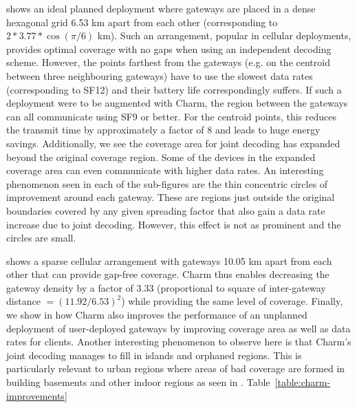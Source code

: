  shows an ideal planned deployment where gateways are placed in a dense hexagonal grid 6.53 km apart from each other (corresponding to $2*3.77*\cos(\pi/6)$ km). Such an arrangement, popular in cellular deployments, provides optimal coverage with no gaps when using an independent decoding scheme. However, the points farthest from the gateways (e.g. on the centroid between three neighbouring gateways) have to use the slowest data rates (corresponding to SF12) and their battery life correspondingly suffers. If such a deployment were to be augmented with Charm, the region between the gateways can all communicate using SF9 or better. For the centroid points, this reduces the transmit time by approximately a factor of 8 and leads to huge energy savings. Additionally, we see the coverage area for joint decoding has expanded beyond the original coverage region. Some of the devices in the expanded coverage area can even communicate with higher data rates. An interesting phenomenon seen in each of the sub-figures are the thin concentric circles of improvement around each gateway. These are regions just outside the original boundaries covered by any given spreading factor that also gain a data rate increase due to joint decoding. However, this effect is not as prominent and the circles are small.

 shows a sparse cellular arrangement with gateways 10.05 km apart from each other that can provide gap-free coverage. Charm thus enables decreasing the gateway density by a factor of 3.33 (proportional to square of inter-gateway distance $=(11.92/6.53)^2$) while providing the same level of coverage. Finally, we show in  how Charm also improves the performance of an unplanned deployment of user-deployed gateways by improving coverage area as well as data rates for clients. Another interesting phenomenon to observe here is that Charm's joint decoding manages to fill in islands and orphaned regions. This is particularly relevant to urban regions where areas of bad coverage are formed in building basements and other indoor regions as seen in . Table~\ref{table:charm-improvements} 

